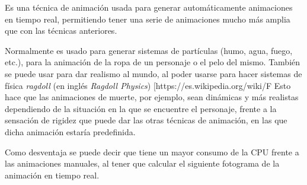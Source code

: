 \documentclass{article}
\begin{document}
Es una técnica de animación usada para generar automáticamente animaciones en tiempo real, permitiendo tener una serie de animaciones mucho más amplia que con las técnicas anteriores. %

\bigskip

Normalmente es usado para generar sistemas de partículas (humo, agua, fuego, etc.), para la animación de la ropa de un personaje o el pelo del mismo. También se puede usar para dar realismo al mundo, al poder usarse para hacer sistemas de física \textit{ragdoll} (en inglés \textit{Ragdoll Physics}) [https://es.wikipedia.org/wiki/F%
Esto hace que las animaciones de muerte, por ejemplo, sean dinámicas y más realistas dependiendo de la situación en la que se encuentre el personaje, frente a la sensación de rigidez que puede dar las otras técnicas de animación, en las que dicha animación estaría predefinida.

\bigskip

Como desventaja se puede decir que tiene un mayor consumo de la CPU frente a las animaciones manuales, al tener que calcular el siguiente fotograma de la animación en tiempo real.
\end{document}

